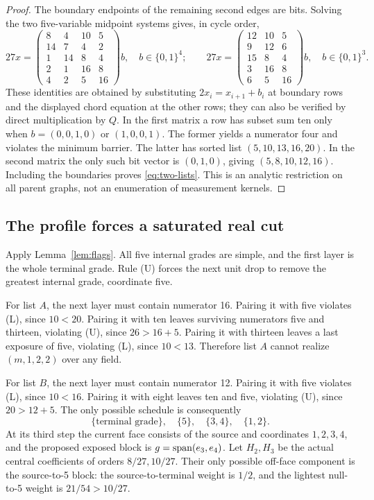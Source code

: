 \begin{proof}
The boundary endpoints of the remaining second edges are bits. Solving the two five-variable midpoint systems gives, in cycle order,
\begin{equation}\label{eq:bitmatrices}
27x=
\begin{pmatrix}8&4&10&5\\14&7&4&2\\1&14&8&4\\2&1&16&8\\4&2&5&16\end{pmatrix}b,
\quad b\in\{0,1\}^4;
\qquad
27x=
\begin{pmatrix}12&10&5\\9&12&6\\15&8&4\\3&16&8\\6&5&16\end{pmatrix}b,
\quad b\in\{0,1\}^3.
\end{equation}
These identities are obtained by substituting $2x_i=x_{i+1}+b_i$ at boundary rows and the displayed chord equation at the other rows; they can also be verified by direct multiplication by $Q$. In the first matrix a row has subset sum ten only when $b=(0,0,1,0)$ or $(1,0,0,1)$. The former yields a numerator four and violates the minimum barrier. The latter has sorted list $(5,10,13,16,20)$. In the second matrix the only such bit vector is $(0,1,0)$, giving $(5,8,10,12,16)$. Including the boundaries proves \eqref{eq:two-lists}. This is an analytic restriction on all parent graphs, not an enumeration of measurement kernels.
\end{proof}

\subsection{The profile forces a saturated real cut}
Apply Lemma~\ref{lem:flags}. All five internal grades are simple, and the first layer is the whole terminal grade. Rule (U) forces the next unit drop to remove the greatest internal grade, coordinate five.

For list $A$, the next layer must contain numerator 16. Pairing it with five violates (L), since $10<20$. Pairing it with ten leaves surviving numerators five and thirteen, violating (U), since $26>16+5$. Pairing it with thirteen leaves a last exposure of five, violating (L), since $10<13$. Therefore list $A$ cannot realize $(m,1,2,2)$ over any field.

For list $B$, the next layer must contain numerator 12. Pairing it with five violates (L), since $10<16$. Pairing it with eight leaves ten and five, violating (U), since $20>12+5$. The only possible schedule is consequently
\begin{equation}\label{eq:forcedschedule}
 \{\text{terminal grade}\},\quad\{5\},\quad\{3,4\},\quad\{1,2\}.
\end{equation}
At its third step the current face consists of the source and coordinates $1,2,3,4$, and the proposed exposed block is $g=\operatorname{span}(e_3,e_4)$. Let $H_2,H_3$ be the actual central coefficients of orders $8/27,10/27$. Their only possible off-face component is the source-to-5 block: the source-to-terminal weight is $1/2$, and the lightest null-to-5 weight is $21/54>10/27$.

